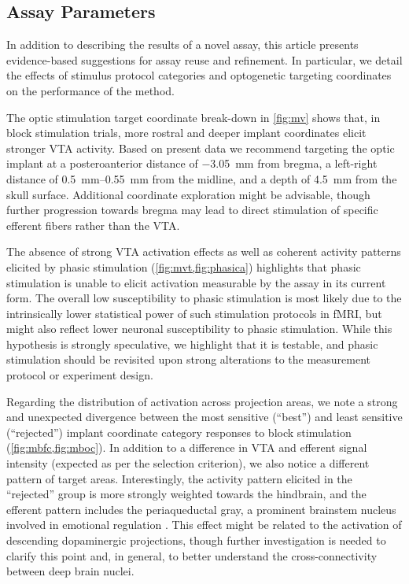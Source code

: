 \subsection{Assay Parameters}

In addition to describing the results of a novel assay, this article presents evidence-based suggestions for assay reuse and refinement.
In particular, we detail the effects of stimulus protocol categories and optogenetic targeting coordinates on the performance of the method.

The optic stimulation target coordinate break-down in \cref{fig:mv} shows that, in block stimulation trials, more rostral and deeper implant coordinates elicit stronger VTA activity.
Based on present data we recommend targeting the optic implant at
a posteroanterior distance of \SI{-3.05}{\milli\meter} from bregma,
a left-right distance of \SIrange{0.5}{0.55}{\milli\meter} from the midline,
and a depth of \SI{4.5}{\milli\meter} from the skull surface.
Additional coordinate exploration might be advisable, though further progression towards bregma may lead to direct stimulation of specific efferent fibers rather than the VTA.

The absence of strong VTA activation effects as well as coherent activity patterns elicited by phasic stimulation (\cref{fig:mvt,fig:phasica}) highlights that phasic stimulation is unable to elicit activation measurable by the assay in its current form.
The overall low susceptibility to phasic stimulation is most likely due to the intrinsically lower statistical power of such stimulation protocols in fMRI, but might also reflect lower neuronal susceptibility to phasic stimulation.
While this hypothesis is strongly speculative, we highlight that it is testable, and phasic stimulation should be revisited upon strong alterations to the measurement protocol or experiment design.

Regarding the distribution of activation across projection areas, we note a strong and unexpected divergence between the most sensitive (“best”) and least sensitive (“rejected”) implant coordinate category responses to block stimulation (\cref{fig:mbfc,fig:mboc}).
In addition to a difference in VTA and efferent signal intensity (expected as per the selection criterion), we also notice a different pattern of target areas.
Interestingly, the activity pattern elicited in the “rejected” group is more strongly weighted towards the hindbrain, and the efferent pattern includes the periaqueductal gray, a prominent brainstem nucleus involved in emotional regulation \cite{Benarroch2012}.
This effect might be related to the activation of descending dopaminergic projections, though further investigation is needed to clarify this point and, in general, to better understand the cross-connectivity between deep brain nuclei.

